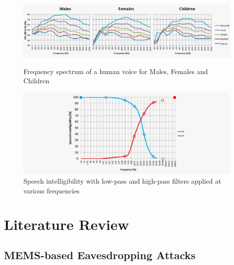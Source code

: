 \documentclass[sigconf, nonacm]{acmart}
\begin{document}
\begin{figure}[H]
  \centering
  \includegraphics[width=\linewidth]{embed/Speech_frequency_spectrum.jpg}
  \caption{Frequency spectrum of a human voice for Males, Females and Children \cite{DPAMicrophonesFactsAboutSpeechIntelligibility}}
  \label{fig:SpeechFrequencySpectrum}

  \vspace{0.5cm}

  \includegraphics[width=\linewidth]{embed/Speech_Intelligibility_Low_High_Pass_Filter.jpg}
  \caption{Speech intelligibility with low-pass and high-pass filters applied at various frequencies \cite{DPAMicrophonesFactsAboutSpeechIntelligibility}}
  \label{fig:SpeechIntelligibility}
\end{figure}

\section{Literature Review}
\subsection{MEMS-based Eavesdropping Attacks}
\end{document}
